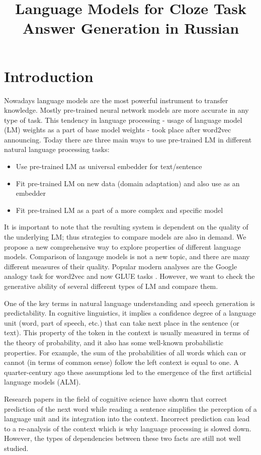 \documentclass[a4paper]{article}
\title{Language Models for Cloze Task Answer Generation in {Russian}}
\begin{document}
\maketitleabstract
\nocite{*}


\section{Introduction}

Nowadays language models are the most powerful instrument to transfer knowledge. Mostly pre-trained neural network models are more accurate in any type of task. This tendency in language processing - usage of language model (LM) weights as a part of base model weights - took place after word2vec announcing. Today there are three main ways to use pre-trained LM in different natural language processing tasks:
\begin{itemize}
	\item Use pre-trained LM as universal embedder for text/sentence
	\item Fit pre-trained LM on new data (domain adaptation) and also use as an embedder
	\item Fit pre-trained LM as a part of a more complex and specific model
\end{itemize}
It is important to note that the resulting system is dependent on the
quality of the underlying LM; thus strategies to compare models are
also in demand. We propose a new comprehensive way to explore properties of different language models.
Comparison of langauge models is not a new topic, and there are many
different measures of their quality. Popular modern analyses are the
Google analogy task for word2vec \cite{mikolov2013efficient} and now
GLUE tasks \cite{Wang2018GLUEAM}. However, we want to check the
generative ability of several different types of LM and compare them.

One of the key terms in natural language understanding and speech generation is predictability. In cognitive linguistics, it implies a confidence degree of a language unit (word, part of speech, etc.) that can take next place in the sentence (or text). This property of the token in the context is usually measured in terms of the theory of probability, and it also has some well-known probabilistic properties. For example, the sum of the probabilities of all words which can or cannot (in terms of common sense) follow the left context is equal to one. A quarter-century ago these assumptions led to the emergence of the first artificial language models (ALM).

Research papers in the field of cognitive science have shown that correct prediction of the next word while reading a sentence simplifies the perception of a language unit and its integration into the context. Incorrect prediction can lead to a re-analysis of the context which is why language processing is slowed down. However, the types of dependencies between these two facts are still not well studied.
\end{document}

